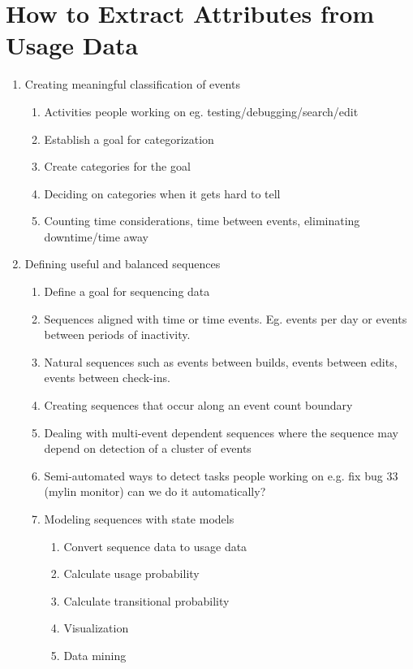 \section{ How to Extract Attributes from Usage Data}


  \begin{enumerate}
  \item Creating meaningful classification of events
	\begin{enumerate}
	\item
	Activities people working on eg. testing/debugging/search/edit
	\item
	Establish a goal for categorization
	\item
	Create categories for the goal
	\item
	Deciding on categories when it gets hard to tell
	\item
	Counting time considerations, time between events, eliminating downtime/time away
	\end{enumerate}
  \item Defining useful and balanced sequences %
	\begin{enumerate}
	\item
	Define a goal for sequencing data
	\item
	Sequences aligned with time or time events.  Eg. events per day or events
	between periods of inactivity.
	\item
	Natural sequences such as events between builds, events between edits, events between check-ins.
	\item
	Creating sequences that occur along an event count boundary
	\item 
	Dealing with multi-event dependent sequences where the sequence may depend on detection of a cluster of events
	\item
	Semi-automated ways to detect tasks people working on e.g. fix bug 33 (mylin monitor) can we do it automatically?

  \item  Modeling sequences with state models %
                \begin{enumerate}
                \item Convert sequence data to usage data
                \item Calculate usage probability
                \item Calculate transitional probability
                \item Visualization
                \item Data mining
                \end{enumerate}
	\end{enumerate}

  \end{enumerate}